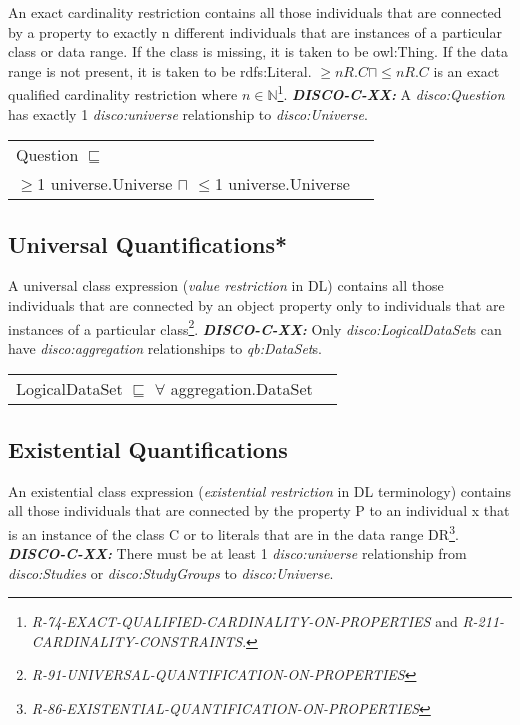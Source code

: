 \documentclass{elsart3p}    %
\newenvironment{DL}{
  \vspace{0cm}
  \begin{tabular}{l l}

}{
  \end{tabular}
}
\begin{document}
An exact cardinality restriction contains all those individuals that are connected by a property to exactly n different individuals that are instances of a particular class or data range. 
If the class is missing, it is taken to be owl:Thing. 
If the data range is not present, it is taken to be rdfs:Literal.
$\geq n R. C \sqcap \leq n R. C $ is an exact qualified cardinality restriction where $n \in \mathbb{N}$\footnote{{\em R-74-EXACT-QUALIFIED-CARDINALITY-ON-PROPERTIES} and {\em R-211-CARDINALITY-CONSTRAINTS}.}.
\textbf{{\em DISCO-C-XX:}}
A {\em disco:Question} has exactly 1 {\em disco:universe} relationship to {\em disco:Universe}.

\begin{DL}
Question $\sqsubseteq$ \\
$\geq$1 universe.Universe $\sqcap$ $\leq$1 universe.Universe \\
\end{DL}

\subsection{Universal Quantifications*}

A universal class expression ({\em value restriction} in DL) contains all those individuals that are connected by an object property only to individuals that are instances of a particular class\footnote{{\em R-91-UNIVERSAL-QUANTIFICATION-ON-PROPERTIES}}.
\textbf{{\em DISCO-C-XX:}}
Only {\em disco:LogicalDataSet}s can have {\em disco:aggregation} relationships to {\em qb:DataSet}s.

\begin{DL}
LogicalDataSet $\sqsubseteq$ $\forall$ aggregation.DataSet \\
\end{DL}

\subsection{Existential Quantifications}

An existential class expression ({\em existential restriction} in DL terminology) contains all those individuals that are connected by the property P to an individual x that is an instance of the class C or to literals that are in the data range DR\footnote{{\em R-86-EXISTENTIAL-QUANTIFICATION-ON-PROPERTIES}}.
\textbf{{\em DISCO-C-XX:}} 
There must be at least 1 {\em disco:universe} relationship from {\em disco:Studies} or {\em disco:StudyGroups} to {\em disco:Universe}.
\end{document}
